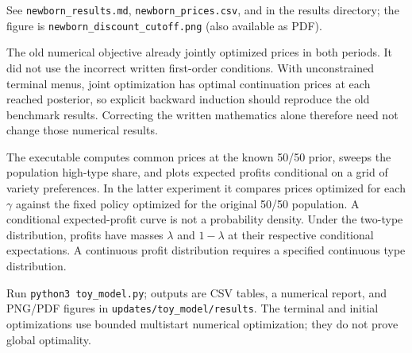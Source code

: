 \documentclass[12pt]{article}
\theoremstyle{definition}
\theoremstyle{remark}
\numberwithin{equation}{section}
\begin{document}
See \texttt{newborn\_results.md}, \texttt{newborn\_prices.csv}, and
 in the results directory; the figure
is \texttt{newborn\_discount\_cutoff.png} (also available as PDF).

The old numerical objective already jointly optimized prices in both periods.
It did not use the incorrect written first-order conditions. With unconstrained
terminal menus, joint optimization has optimal continuation prices at each
reached posterior, so explicit backward induction should reproduce the old
benchmark results. Correcting the written mathematics alone therefore need
not change those numerical results.

The executable computes common prices at the known 50/50 prior, sweeps the
population high-type share, and plots expected profits conditional on a grid
of variety preferences. In the latter experiment it compares prices optimized
for each $\gamma$ against the fixed policy optimized for the original 50/50
population. A conditional expected-profit curve is not a probability density.
Under the two-type distribution, profits have masses $\lambda$ and $1-\lambda$
at their respective conditional expectations. A continuous profit distribution
requires a specified continuous type distribution.

Run \texttt{python3 toy\_model.py}; outputs are CSV tables, a numerical report,
and PNG/PDF figures in \texttt{updates/toy\_model/results}. The terminal and initial optimizations use
bounded multistart numerical optimization; they do not prove global optimality.
\end{document}
